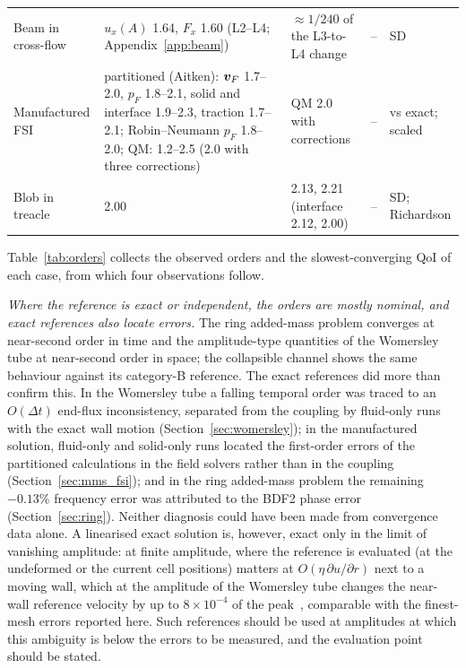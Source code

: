 \begin{table}[htbp]
\begin{tabular}{p{2.3cm}p{4.3cm}p{2.9cm}p{2.9cm}p{1.6cm}}
		Beam in cross-flow & $u_x(A)$ 1.64, $F_x$ 1.60 (L2--L4; Appendix~\ref{app:beam}) & $\approx1/240$ of the L3-to-L4 change & -- & SD \\
		Manufactured FSI & partitioned (Aitken): $\boldsymbol{v}_F$ 1.7--2.0, $p_F$ 1.8--2.1, solid and interface 1.9--2.3, traction 1.7--2.1; Robin--Neumann $p_F$ 1.8--2.0; QM: 1.2--2.5 (2.0 with three corrections) & QM 2.0 with corrections & -- & vs exact; scaled \\
		Blob in treacle & 2.00 & 2.13, 2.21 (interface 2.12, 2.00) & -- & SD; Richardson \\
		\bottomrule
	\end{tabular}
\end{table}

Table~\ref{tab:orders} collects the observed orders and the slowest-converging QoI of each case, from which four observations follow.

\emph{Where the reference is exact or independent, the orders are mostly nominal, and exact references also locate errors.}
The ring added-mass problem converges at near-second order in time and the amplitude-type quantities of the Womersley tube at near-second order in space; the collapsible channel shows the same behaviour against its category-B reference.
The exact references did more than confirm this.
In the Womersley tube a falling temporal order was traced to an $O(\Delta t)$ end-flux inconsistency, separated from the coupling by fluid-only runs with the exact wall motion (Section~\ref{sec:womersley}); in the manufactured solution, fluid-only and solid-only runs located the first-order errors of the partitioned calculations in the field solvers rather than in the coupling (Section~\ref{sec:mms_fsi}); and in the ring added-mass problem the remaining $-0.13\%$ frequency error was attributed to the BDF2 phase error (Section~\ref{sec:ring}).
Neither diagnosis could have been made from convergence data alone.
A linearised exact solution is, however, exact only in the limit of vanishing amplitude: at finite amplitude, where the reference is evaluated (at the undeformed or the current cell positions) matters at $O(\eta\,\partial u/\partial r)$ next to a moving wall, which at the amplitude of the Womersley tube changes the near-wall reference velocity by up to $8\times10^{-4}$ of the peak~\citep{CardiffBatistic2026QM}, comparable with the finest-mesh errors reported here.
Such references should be used at amplitudes at which this ambiguity is below the errors to be measured, and the evaluation point should be stated.

